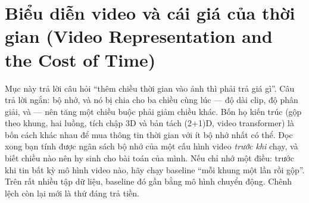 \documentclass[../../../deep_learning.tex]{subfiles}
\begin{document}
\section{Biểu diễn video và cái giá của thời gian (Video Representation and the Cost of Time)}

\begin{tomtat}
Mục này trả lời câu hỏi ``thêm chiều thời gian vào ảnh thì phải trả giá gì''. Câu trả lời ngắn: bộ nhớ, và nó bị chia cho ba chiều cùng lúc --- độ dài clip, độ phân giải, và  --- nên tăng một chiều buộc phải giảm chiều khác. Bốn họ kiến trúc (gộp theo khung, hai luồng, tích chập 3D và bản tách (2+1)D, video transformer) là bốn cách khác nhau để mua thông tin thời gian với ít bộ nhớ nhất có thể. Đọc xong bạn tính được ngân sách bộ nhớ của một cấu hình video \emph{trước khi} chạy, và biết chiều nào nên hy sinh cho bài toán của mình. Nếu chỉ nhớ một điều: trước khi tin bất kỳ mô hình video nào, hãy chạy baseline ``mỗi khung một lần rồi gộp''. Trên rất nhiều tập dữ liệu, baseline đó gần bằng mô hình chuyển động. Chênh lệch còn lại mới là thứ đáng trả tiền.
\end{tomtat}
\end{document}
